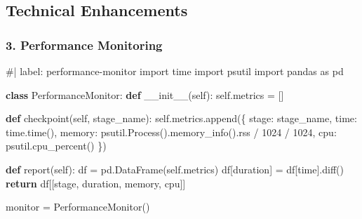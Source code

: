 \documentclass[
  11pt,
  letterpaper,
]{book}
\newenvironment{Shaded}{\begin{snugshade}}{\end{snugshade}}
\newcommand{\CommentTok}[1]{\textcolor[rgb]{0.37,0.37,0.37}{#1}}
\newcommand{\ControlFlowTok}[1]{\textcolor[rgb]{0.00,0.23,0.31}{\textbf{#1}}}
\newcommand{\DecValTok}[1]{\textcolor[rgb]{0.68,0.00,0.00}{#1}}
\newcommand{\FunctionTok}[1]{\textcolor[rgb]{0.28,0.35,0.67}{#1}}
\newcommand{\ImportTok}[1]{\textcolor[rgb]{0.00,0.46,0.62}{#1}}
\newcommand{\KeywordTok}[1]{\textcolor[rgb]{0.00,0.23,0.31}{\textbf{#1}}}
\newcommand{\NormalTok}[1]{\textcolor[rgb]{0.00,0.23,0.31}{#1}}
\newcommand{\OperatorTok}[1]{\textcolor[rgb]{0.37,0.37,0.37}{#1}}
\newcommand{\StringTok}[1]{\textcolor[rgb]{0.13,0.47,0.30}{#1}}
\newcommand{\VariableTok}[1]{\textcolor[rgb]{0.07,0.07,0.07}{#1}}
\begin{document}
\subsection{Technical Enhancements}\label{technical-enhancements}

\subsubsection{3. Performance Monitoring}\label{performance-monitoring}

\begin{Shaded}
\begin{Highlighting}[]
\CommentTok{\#| label: performance{-}monitor}
\ImportTok{import}\NormalTok{ time}
\ImportTok{import}\NormalTok{ psutil}
\ImportTok{import}\NormalTok{ pandas }\ImportTok{as}\NormalTok{ pd}

\KeywordTok{class}\NormalTok{ PerformanceMonitor:}
    \KeywordTok{def} \FunctionTok{\_\_init\_\_}\NormalTok{(}\VariableTok{self}\NormalTok{):}
        \VariableTok{self}\NormalTok{.metrics }\OperatorTok{=}\NormalTok{ []}
    
    \KeywordTok{def}\NormalTok{ checkpoint(}\VariableTok{self}\NormalTok{, stage\_name):}
        \VariableTok{self}\NormalTok{.metrics.append(\{}
            \StringTok{\textquotesingle{}stage\textquotesingle{}}\NormalTok{: stage\_name,}
            \StringTok{\textquotesingle{}time\textquotesingle{}}\NormalTok{: time.time(),}
            \StringTok{\textquotesingle{}memory\textquotesingle{}}\NormalTok{: psutil.Process().memory\_info().rss }\OperatorTok{/} \DecValTok{1024} \OperatorTok{/} \DecValTok{1024}\NormalTok{,}
            \StringTok{\textquotesingle{}cpu\textquotesingle{}}\NormalTok{: psutil.cpu\_percent()}
\NormalTok{        \})}
    
    \KeywordTok{def}\NormalTok{ report(}\VariableTok{self}\NormalTok{):}
\NormalTok{        df }\OperatorTok{=}\NormalTok{ pd.DataFrame(}\VariableTok{self}\NormalTok{.metrics)}
\NormalTok{        df[}\StringTok{\textquotesingle{}duration\textquotesingle{}}\NormalTok{] }\OperatorTok{=}\NormalTok{ df[}\StringTok{\textquotesingle{}time\textquotesingle{}}\NormalTok{].diff()}
        \ControlFlowTok{return}\NormalTok{ df[[}\StringTok{\textquotesingle{}stage\textquotesingle{}}\NormalTok{, }\StringTok{\textquotesingle{}duration\textquotesingle{}}\NormalTok{, }\StringTok{\textquotesingle{}memory\textquotesingle{}}\NormalTok{, }\StringTok{\textquotesingle{}cpu\textquotesingle{}}\NormalTok{]]}

\NormalTok{monitor }\OperatorTok{=}\NormalTok{ PerformanceMonitor()}
\end{Highlighting}
\end{Shaded}
\end{document}
